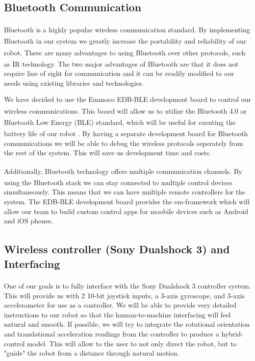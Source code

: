 \documentclass[11pt]{report}
\begin{document}
\begin{spacing}{1.5}
\subsection*{Bluetooth\textsuperscript{\textregistered} Communication}

Bluetooth\textsuperscript{\textregistered} is a highly popular wireless communication standard.  By implementing Bluetooth\textsuperscript{\textregistered} in our system we greatly increase the portability and reliability of our robot.  There are many advantages to using Bluetooth\textsuperscript{\textregistered} over other protocols, such as IR technology.  The two major advantages of Bluetooth\textsuperscript{\textregistered} are that it does not require line of sight for communication and it can be readily modified to our needs using existing libraries and technologies.

We have decided to use the Emmoco EDB-BLE development board to control our wireless communications.  This board will allow us to utilize the Bluetooth\textsuperscript{\textregistered} 4.0 or Bluetooth\textsuperscript{\textregistered} Low Energy (BLE) standard, which will be useful for exenting the battery life of our robot \cite{Nokia}.  By having a separate development board for Bluetooth\textsuperscript{\textregistered} communications we will be able to debug the wireless protocols seperately from the rest of the system.  This will save us development time and costs.

Additionally, Bluetooth\textsuperscript{\textregistered} technology offers multiple communication channels.  By using the Bluetooth\textsuperscript{\textregistered} stack we can stay connected to multiple control devices simultaneously.  This means that we can have multiple remote controllers for the system.  The EDB-BLE development board provides the em-framework which will allow our team to build custom control apps for moobile devices such as Android and iOS phones.

\subsection*{Wireless controller (Sony Dualshock 3\textsuperscript{\textregistered}) and Interfacing}

One of our goals is to fully interface with the Sony Dualshock 3\textsuperscript{\textregistered} controller system.  This will provide us with 2 10-bit joystick inputs, a 3-axis gyroscope, and 3-axis accelerometer for use as a controller.  We will be able to provide very detailed instructions to our robot so that the human-to-machine interfacing will feel natural and smooth.  If possible, we will try to integrate the rotational orientation and translational acceleration readings from the controller to produce a hybrid-control model.  This will allow to the user to not only direct the robot, but to "guide" the robot from a distance through natural motion.


\end{spacing}
\end{document}
